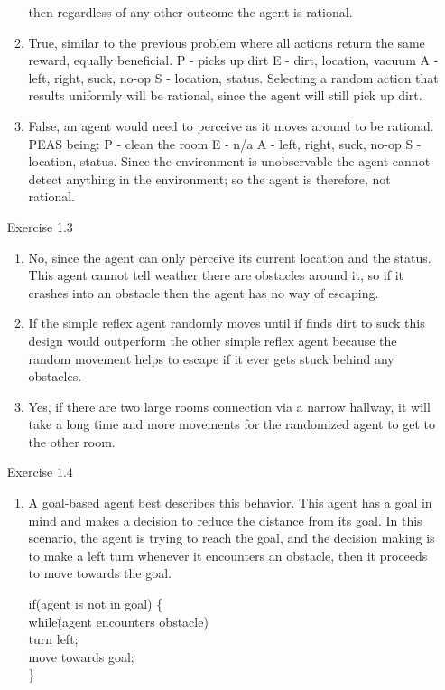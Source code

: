 \documentclass[letterpaper, 12pt]{article}
\begin{document}
\begin{enumerate}
\begin{enumerate}
        then regardless of any other outcome the agent is rational.
        \item True, similar to the previous problem where all actions return the same reward, equally beneficial. 
        P - picks up dirt E - dirt, location, vacuum A - left, right, suck, no-op S - location, status.
        Selecting a random action that results uniformly will be rational, since the agent will still pick up dirt.
        \item False, an agent would need to perceive as it moves around to be rational. PEAS being: 
        P - clean the room E - n/a A - left, right, suck, no-op S - location, status. Since the environment is 
        unobservable the agent cannot detect anything in the environment; so the agent is therefore, not rational.
    \end{enumerate} 
    \item[Exercise 1.3] 
    \begin{enumerate}
        \item 
        No, since the agent can only perceive its current location and the status. This agent cannot tell
        weather there are obstacles around it, so if it crashes into an obstacle then the agent has no way of escaping.
        \item 
        If the simple reflex agent randomly moves until if finds dirt to suck this design would outperform
        the other simple reflex agent because the random movement helps to escape if it ever gets stuck 
        behind any obstacles.
        \item 
        Yes, if there are two large rooms connection via a narrow hallway, it will take a long time and more
        movements for the randomized agent to get to the other room. 
    \end{enumerate} 
    \item[Exercise 1.4]
    \begin{enumerate}
        \item A goal-based agent best describes this behavior. This agent has a goal in mind and makes a decision to 
        reduce the distance from its goal. In this scenario, the agent is trying to reach the goal, and the decision making is
        to make a left turn whenever it encounters an obstacle, then it proceeds to move towards the goal. 
        
        \begin{tabbing}
            if\=(agent is not in goal) \{ \\
             \> while\=(agent encounters obstacle) \\
                \> \> turn left; \\
                \> move towards goal; \\ 
            \}
        \end{tabbing}


\end{enumerate}
\end{enumerate}
\end{document}
